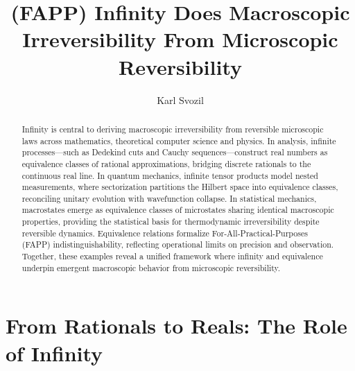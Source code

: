 \documentclass[shortAfour,sageh,times]{sagej}
\begin{document}

\title{(FAPP) Infinity Does Macroscopic Irreversibility From Microscopic Reversibility}

\author{Karl Svozil}



\begin{abstract}
Infinity is central to deriving macroscopic irreversibility from reversible microscopic laws across mathematics, theoretical computer science and physics.
In analysis, infinite processes---such as Dedekind cuts and Cauchy sequences---construct real numbers as equivalence classes of rational approximations, bridging discrete rationals to the continuous real line.
In quantum mechanics, infinite tensor products model nested measurements, where sectorization partitions the Hilbert space into equivalence classes, reconciling unitary evolution with wavefunction collapse.
In statistical mechanics, macrostates emerge as equivalence classes of microstates sharing identical macroscopic properties, providing the statistical basis for thermodynamic irreversibility despite reversible dynamics.
Equivalence relations formalize For-All-Practical-Purposes (FAPP) indistinguishability, reflecting operational limits on precision and observation.
Together, these examples reveal a unified framework where infinity and equivalence underpin emergent macroscopic behavior from microscopic reversibility.
\end{abstract}


\maketitle

\section{From Rationals to Reals: The Role of Infinity}
\end{document}
